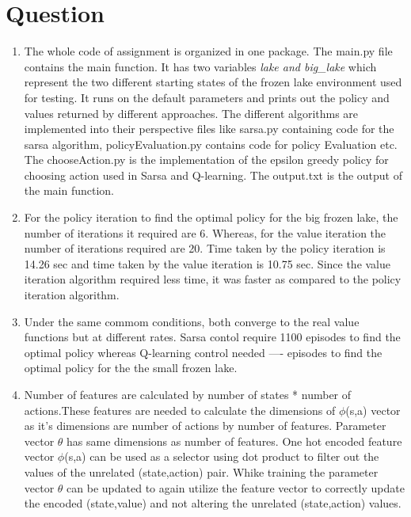 \documentclass[11pt]{article}
\begin{document}
\section {Question}
	\begin{enumerate}
		\item The whole code of assignment is organized in one package. The main.py file contains the main function. It has two variables \textit{lake and big\_lake} which represent the two different starting states of the frozen lake environment used for testing. It runs on the default parameters and prints out the policy and values returned by different approaches.  The different algorithms are implemented into their perspective files like sarsa.py containing code for the sarsa algorithm,  policyEvaluation.py contains code for policy Evaluation etc. The chooseAction.py is the implementation of the epsilon greedy policy for choosing action used in Sarsa and Q-learning. The output.txt is the output of the main function.
		
		\item For the policy iteration to find the optimal policy for the big frozen lake, the number of iterations it required are 6. Whereas, for the value iteration the number of iterations required are 20. Time taken by the policy iteration is 14.26 sec and time taken by the value iteration is 10.75 sec. Since the value iteration algorithm required less time, it was faster as compared to the policy iteration algorithm.
		
		\item Under the same commom conditions, both converge to the real value functions but at different rates. Sarsa contol require 1100 episodes to find the optimal policy whereas Q-learning control needed ---- episodes to find the optimal policy for the the small frozen lake. 
		
		\item Number of features are calculated by number of states * number of actions.These features are needed to calculate the dimensions of $\phi$(s,a) vector as it's dimensions are number of actions by number of features. Parameter vector $\theta$ has same dimensions as number of features. One hot encoded feature vector $\phi$(s,a) can be used as a selector using dot product to filter out the values of the unrelated (state,action) pair. Whike training the parameter vector $\theta$ can be updated to again utilize the feature vector to correctly update the encoded (state,value) and not altering the unrelated (state,action) values. \par
		

\end{enumerate}
\end{document}

